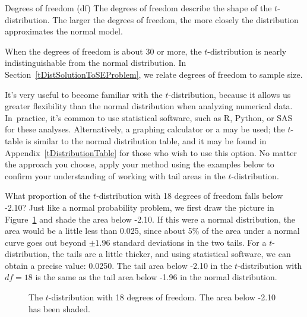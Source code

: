 \begin{onebox}{Degrees of freedom (df)}
The degrees of freedom describe the shape of the $t$-distribution. The larger the degrees of freedom, the more closely the distribution approximates the normal model.
\end{onebox}

When the degrees of freedom is about 30 or more,
the $t$-distribution is nearly indistinguishable
from the normal distribution.
In Section~\ref{tDistSolutionToSEProblem},
we relate degrees of freedom to sample size.

It's very useful to become familiar with the $t$-distribution, because it allows us greater flexibility than the normal distribution when analyzing numerical data.
In~practice, it's common to use statistical software,
such as R, Python, or SAS for these analyses.
Alternatively, a graphing calculator or a 
may be used;
the $t$-table is similar to the normal distribution table,
and it may be found in Appendix~\ref{tDistributionTable}
for those who wish to use this option.
No matter the approach you choose, apply your method
using the examples below to confirm your understanding
of working with tail areas in the $t$-distribution.

\begin{examplewrap}
\begin{nexample}{What proportion of the $t$-distribution
    with 18 degrees of freedom falls below -2.10?}
  Just like a normal probability problem, we first draw
  the picture in Figure~\ref{tDistDF18LeftTail2Point10}
  and shade the area below -2.10.
  If this were a normal distribution, the area would be
  a little less than 0.025, since about 5\% of the area
  under a normal curve goes out beyond $\pm 1.96$ standard
  deviations in the two tails.
  For a $t$-distribution, the tails are a little thicker,
  and using statistical software, we can obtain a precise
  value: 0.0250.
  The tail area below -2.10 in the $t$-distribution with
  $df = 18$ is the same as the tail area below -1.96 in
  the normal distribution.
\end{nexample}
\end{examplewrap}

\begin{figure}
  \centering
  \caption{The $t$-distribution with 18 degrees of freedom.
      The area below -2.10 has been shaded.}
  \label{tDistDF18LeftTail2Point10}
\end{figure}

